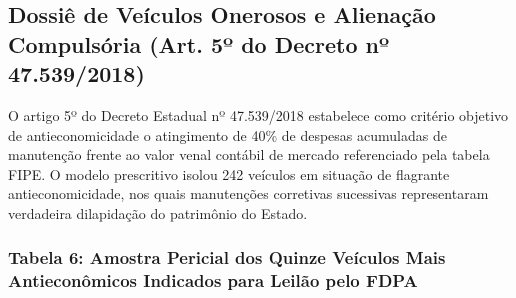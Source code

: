 \documentclass[12pt,a4paper]{article}
\begin{document}
\subsection{Dossiê de Veículos Onerosos e Alienação Compulsória (Art. 5º do Decreto nº 47.539/2018)}

O artigo 5º do Decreto Estadual nº 47.539/2018 estabelece como critério objetivo de antieconomicidade o atingimento de 40\% de despesas acumuladas de manutenção frente ao valor venal contábil de mercado referenciado pela tabela FIPE. O modelo prescritivo isolou 242 veículos em situação de flagrante antieconomicidade, nos quais manutenções corretivas sucessivas representaram verdadeira dilapidação do patrimônio do Estado.


\subsubsection{Tabela 6: Amostra Pericial dos Quinze Veículos Mais Antieconômicos Indicados para Leilão pelo FDPA}
\end{document}
